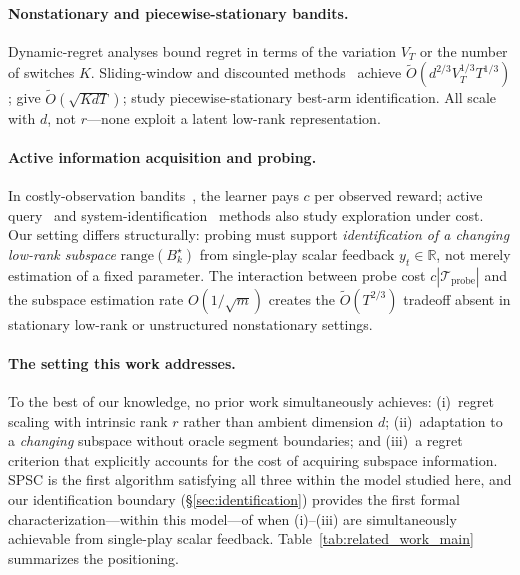 \documentclass{article}
\newcommand{\R}{\mathbb{R}}
\newcommand{\cTprobe}{\mathcal{T}_{\mathrm{probe}}}
\newcommand{\range}{\mathrm{range}}
\begin{document}
\paragraph{Nonstationary and piecewise-stationary bandits.}
Dynamic-regret analyses bound regret in terms of the variation $V_T$ or the number of switches $K$.
Sliding-window and discounted methods~\citep{russac2019weighted, cheung2019learning} achieve $\widetilde O(d^{2/3}V_T^{1/3}T^{1/3})$; \citet{abbasi2023dynamic} give $\widetilde O(\sqrt{KdT})$; \citet{hou2024pslb} study piecewise-stationary best-arm identification. All scale with $d$, not $r$---none exploit a latent low-rank representation.

\paragraph{Active information acquisition and probing.}
In costly-observation bandits~\citep{seldin2014paid, tucker2023costly, elumar2025costly}, the learner pays $c$ per observed reward; active query~\citep{sekhari2023contextual} and system-identification~\citep{memmel2024asid} methods also study exploration under cost.
Our setting differs structurally: probing must support \emph{identification of a changing low-rank subspace} $\range(B_k^\star)$ from single-play scalar feedback $y_t \in \R$, not merely estimation of a fixed parameter.
The interaction between probe cost $c|\cTprobe|$ and the subspace estimation rate $O(1/\sqrt{m})$ creates the $\widetilde O(T^{2/3})$ tradeoff absent in stationary low-rank or unstructured nonstationary settings.

\paragraph{The setting this work addresses.}
To the best of our knowledge, no prior work simultaneously achieves:
(i)~regret scaling with intrinsic rank $r$ rather than ambient dimension $d$;
(ii)~adaptation to a \emph{changing} subspace without oracle segment boundaries;
and (iii)~a regret criterion that explicitly accounts for the cost of acquiring subspace information.
SPSC is the first algorithm satisfying all three within the model studied here, and our identification boundary (\S\ref{sec:identification}) provides the first formal characterization---within this model---of when (i)--(iii) are simultaneously achievable from single-play scalar feedback.
Table~\ref{tab:related_work_main} summarizes the positioning.
\end{document}
